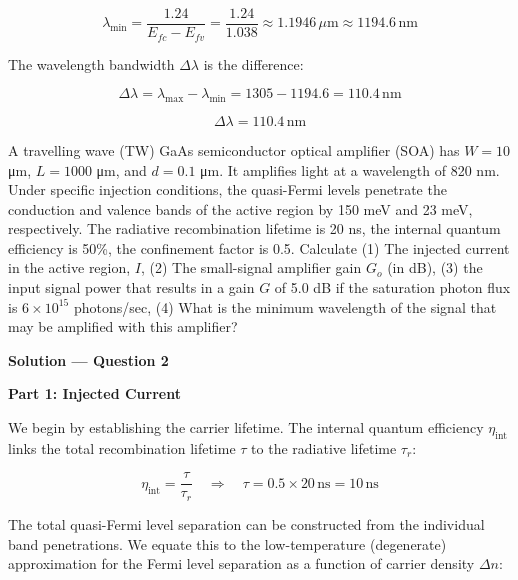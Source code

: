 \begin{equation*}
  \lambda_{\text{min}} = \frac{1.24}{E_{fc} - E_{fv}} = \frac{1.24}{1.038} \approx 1.1946\,\mu\text{m} \approx 1194.6\,\text{nm}
\end{equation*}

The wavelength bandwidth $\Delta \lambda$ is the difference:

\begin{equation*}
  \Delta \lambda = \lambda_{\text{max}} - \lambda_{\text{min}} = 1305 - 1194.6 = 110.4\,\text{nm}
\end{equation*}

\begin{equation*}
  \boxed{\Delta \lambda = 110.4\,\text{nm}}
\end{equation*}

\begin{question}[Question 2]
A travelling wave (TW) GaAs semiconductor optical amplifier (SOA) has $W = 10$ \si{\micro\meter}, $L = 1000$ \si{\micro\meter}, and $d = 0.1$ \si{\micro\meter}. It amplifies light at a wavelength of 820 nm. Under specific injection conditions, the quasi-Fermi levels penetrate the conduction and valence bands of the active region by 150 meV and 23 meV, respectively. The radiative recombination lifetime is 20 ns, the internal quantum efficiency is 50\%, the confinement factor is 0.5. Calculate (1) The injected current in the active region, $I$, (2) The small-signal amplifier gain $G_o$ (in dB), (3) the input signal power that results in a gain $G$ of 5.0 dB if the saturation photon flux is $6 \times 10^{15}$ photons/sec, (4) What is the minimum wavelength of the signal that may be amplified with this amplifier?
\end{question}

\textbf{\large Solution --- Question 2}

\textbf{Part 1: Injected Current}

We begin by establishing the carrier lifetime. The internal quantum efficiency $\eta_{\text{int}}$ links the total recombination lifetime $\tau$ to the radiative lifetime $\tau_r$:

\begin{equation*}
  \eta_{\text{int}} = \frac{\tau}{\tau_r} \quad\Longrightarrow\quad \tau = 0.5 \times 20\,\text{ns} = 10\,\text{ns}
\end{equation*}

The total quasi-Fermi level separation can be constructed from the individual band penetrations. We equate this to the low-temperature (degenerate) approximation for the Fermi level separation as a function of carrier density $\Delta n$:

